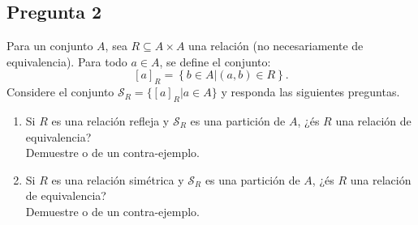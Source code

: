 \documentclass[letter]{article}
\begin{document}
	\begin{pregunta}{2}
		\section*{Pregunta 2}
		Para un conjunto $A$, sea $R\subseteq A\times A$ una relación (no necesariamente de equivalencia). Para todo $a\in A$, se define el conjunto:
		$$ [a]_{R}=\left\lbrace b\in A | (a,b)\in R\right\rbrace.$$
		Considere el conjunto $\mathcal{S}_R=\{[a]_R|a\in A\}$ y responda las siguientes preguntas.
		\begin{enumerate}
		\item Si $R$ es una relación refleja y $\mathcal{S}_R$ es una partición de $A$, ¿és $R$ una relación de equivalencia?\\
		Demuestre o de un contra-ejemplo.
		\item Si $R$ es una relación simétrica y $\mathcal{S}_R$ es una partición de $A$, ¿és $R$ una relación de equivalencia?\\
		Demuestre o de un contra-ejemplo.
		\end{enumerate}
		
	\end{pregunta}
\end{document}
